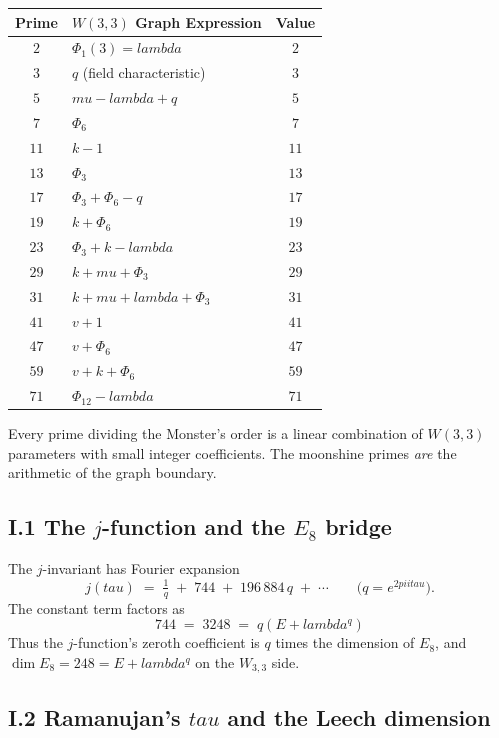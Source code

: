 \documentclass[12pt,a4paper]{article}
\def\textbf#1{#1}%
\def\lambda{lambda}%
\def\mu{mu}%
\def\Phi#1{Phi#1}%
\def\pi{pi}%
\def\tau{tau}%
\def\cdot{ }%
\theoremstyle{definition}
\begin{document}
\begin{center}
\renewcommand{\arraystretch}{1.2}
\begin{tabular}{c l c}
\toprule
\textbf{Prime} & \textbf{$W(3,3)$ Graph Expression} & \textbf{Value} \\
\midrule
$2$ & $\Phi_1(3) = \lambda$ & $2$ \\
$3$ & $q$ (field characteristic) & $3$ \\
$5$ & $\mu - \lambda + q$ & $5$ \\
$7$ & $\Phi_6$ & $7$ \\
$11$ & $k - 1$ & $11$ \\
$13$ & $\Phi_3$ & $13$ \\
$17$ & $\Phi_3 + \Phi_6 - q$ & $17$ \\
$19$ & $k + \Phi_6$ & $19$ \\
$23$ & $\Phi_3 + k - \lambda$ & $23$ \\
$29$ & $k + \mu + \Phi_3$ & $29$ \\
$31$ & $k + \mu + \lambda + \Phi_3$ & $31$ \\
$41$ & $v + 1$ & $41$ \\
$47$ & $v + \Phi_6$ & $47$ \\
$59$ & $v + k + \Phi_6$ & $59$ \\
$71$ & $\Phi_{12} - \lambda$ & $71$ \\
\bottomrule
\end{tabular}
\end{center}
Every prime dividing the Monster's order is a linear combination of $W(3,3)$ parameters with small integer coefficients. The moonshine primes \emph{are} the arithmetic of the graph boundary.

\subsection*{I.1 \quad The $j$-function and the $E_8$ bridge}

The $j$-invariant has Fourier expansion
\[
j(\tau) \;=\; \tfrac{1}{q} \;+\; 744 \;+\; 196\,884\,q \;+\; \cdots\qquad
\bigl(q = e^{2\pi i\tau}\bigr).
\]
The constant term factors as
\[
\boxed{\;744 \;=\; 3\cdot 248 \;=\; q\cdot(E+\lambda^q)\;}
\]
Thus the $j$-function's zeroth coefficient is $q$ times the dimension
of $E_8$, and $\dim E_8 = 248 = E+\lambda^q$ on the $W_{3,3}$ side.

\subsection*{I.2 \quad Ramanujan's $\tau$ and the Leech dimension}
\end{document}
